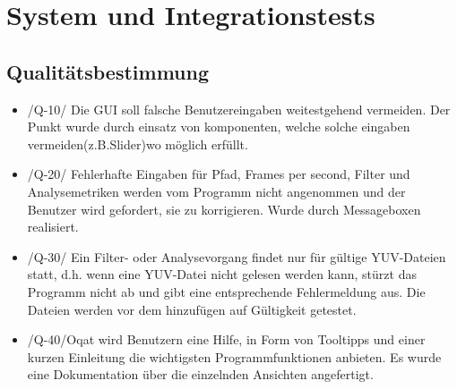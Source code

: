 \chapter{System und Integrationstests}
\section{Qualitätsbestimmung}
\begin{itemize}
\item /Q-10/ Die GUI soll falsche Benutzereingaben weitestgehend vermeiden. \newline
Der Punkt wurde durch einsatz von komponenten, welche solche eingaben vermeiden(z.B.Slider)wo möglich erfüllt.
\item /Q-20/ Fehlerhafte Eingaben für Pfad, Frames per second, Filter und Analysemetriken werden vom Programm nicht angenommen und der Benutzer wird gefordert, sie zu korrigieren. \newline
Wurde durch Messageboxen realisiert.
\item /Q-30/ Ein Filter- oder Analysevorgang findet nur für gültige YUV-Dateien statt, d.h. wenn eine YUV-Datei nicht gelesen werden kann, stürzt das Programm nicht ab und gibt eine entsprechende Fehlermeldung aus. \newline
Die Dateien werden vor dem hinzufügen auf Gültigkeit getestet.
\item  /Q-40/Oqat wird Benutzern eine Hilfe, in Form von Tooltipps und einer kurzen Einleitung die wichtigsten Programmfunktionen anbieten. \newline
Es wurde eine Dokumentation über die einzelnden Ansichten angefertigt.

\end{itemize}
